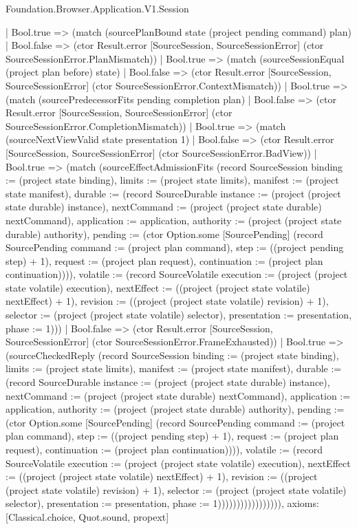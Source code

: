 \begin{lexlean}{Foundation.Browser.Application.V1.Session}
\begin{semanticmodule}
{                    | Bool.true => (match (sourcePlanBound state (project pending command) plan)
                      | Bool.false => (ctor Result.error [SourceSession, SourceSessionError] (ctor SourceSessionError.PlanMismatch))
                      | Bool.true => (match (sourceSessionEqual (project plan before) state)
                        | Bool.false => (ctor Result.error [SourceSession, SourceSessionError] (ctor SourceSessionError.ContextMismatch))
                        | Bool.true => (match (sourcePredecessorFits pending completion plan)
                          | Bool.false => (ctor Result.error [SourceSession, SourceSessionError] (ctor SourceSessionError.CompletionMismatch))
                          | Bool.true => (match (sourceNextViewValid state presentation 1)
                            | Bool.false => (ctor Result.error [SourceSession, SourceSessionError] (ctor SourceSessionError.BadView))
                            | Bool.true => (match (sourceEffectAdmissionFits (record SourceSession {binding := (project state binding), limits := (project state limits), manifest := (project state manifest), durable := (record SourceDurable {instance := (project (project state durable) instance), nextCommand := (project (project state durable) nextCommand), application := application, authority := (project (project state durable) authority), pending := (ctor Option.some [SourcePending] (record SourcePending {command := (project plan command), step := ((project pending step) + 1), request := (project plan request), continuation := (project plan continuation)}))}), volatile := (record SourceVolatile {execution := (project (project state volatile) execution), nextEffect := ((project (project state volatile) nextEffect) + 1), revision := ((project (project state volatile) revision) + 1), selector := (project (project state volatile) selector), presentation := presentation, phase := 1})}))
                              | Bool.false => (ctor Result.error [SourceSession, SourceSessionError] (ctor SourceSessionError.FrameExhausted))
                              | Bool.true => (sourceCheckedReply (record SourceSession {binding := (project state binding), limits := (project state limits), manifest := (project state manifest), durable := (record SourceDurable {instance := (project (project state durable) instance), nextCommand := (project (project state durable) nextCommand), application := application, authority := (project (project state durable) authority), pending := (ctor Option.some [SourcePending] (record SourcePending {command := (project plan command), step := ((project pending step) + 1), request := (project plan request), continuation := (project plan continuation)}))}), volatile := (record SourceVolatile {execution := (project (project state volatile) execution), nextEffect := ((project (project state volatile) nextEffect) + 1), revision := ((project (project state volatile) revision) + 1), selector := (project (project state volatile) selector), presentation := presentation, phase := 1})})))))))))))))))),
  axioms: [Classical.choice, Quot.sound, propext]
}


\end{semanticmodule}
\end{lexlean}
